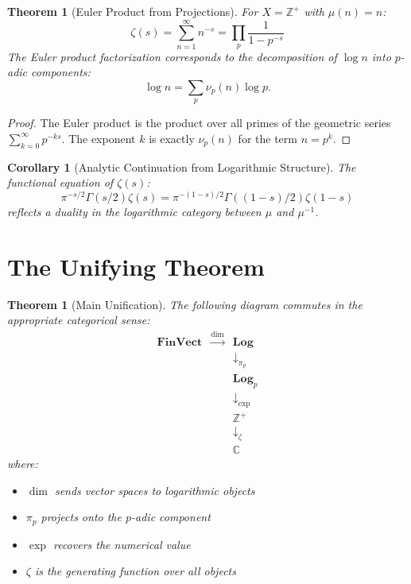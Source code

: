 \documentclass[11pt]{article}
\newtheorem{theorem}[definition]{Theorem}
\newtheorem{corollary}[definition]{Corollary}
\begin{document}
\begin{theorem}[Euler Product from Projections]
For $X = \mathbb{Z}^+$ with $\mu(n) = n$:
\[
\zeta(s) = \sum_{n=1}^{\infty} n^{-s} = \prod_p \frac{1}{1-p^{-s}}
\]
The Euler product factorization corresponds to the decomposition of $\log n$ into $p$-adic components:
\[
\log n = \sum_p \nu_p(n) \log p.
\]
\end{theorem}

\begin{proof}
The Euler product is the product over all primes of the geometric series $\sum_{k=0}^{\infty} p^{-ks}$. The exponent $k$ is exactly $\nu_p(n)$ for the term $n = p^k$.
\end{proof}

\begin{corollary}[Analytic Continuation from Logarithmic Structure]
The functional equation of $\zeta(s)$:
\[
\pi^{-s/2} \Gamma(s/2) \zeta(s) = \pi^{-(1-s)/2} \Gamma((1-s)/2) \zeta(1-s)
\]
reflects a duality in the logarithmic category between $\mu$ and $\mu^{-1}$.
\end{corollary}

\section{The Unifying Theorem}
\label{sec:unifying}

\begin{theorem}[Main Unification]
The following diagram commutes in the appropriate categorical sense:
\[
\begin{array}{ccc}
\mathbf{FinVect} & \xrightarrow{\dim} & \mathbf{Log} \\
& & \downarrow_{\pi_p} \\
& & \mathbf{Log}_p \\
& & \downarrow_{\exp} \\
& & \mathbb{Z}^+ \\
& & \downarrow_{\zeta} \\
& & \mathbb{C}
\end{array}
\]
where:
\begin{itemize}
\item $\dim$ sends vector spaces to logarithmic objects
\item $\pi_p$ projects onto the $p$-adic component
\item $\exp$ recovers the numerical value
\item $\zeta$ is the generating function over all objects
\end{itemize}
\end{theorem}
\end{document}
